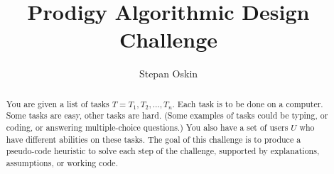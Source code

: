 \documentclass[11pt]{report}
\begin{document}
    \title{Prodigy Algorithmic Design Challenge}

    \author{Stepan Oskin}

    \maketitle

    \begin{abstract}

        You are given a list of tasks $T = T_1, T_2, \dots, T_n$.
        Each task is to be done on a computer.
        Some tasks are easy, other tasks are hard.
        (Some examples of tasks could be typing, or coding, or answering multiple-choice questions.)
        You also have a set of users $U$ who have different abilities on these tasks.
        The goal of this challenge is to produce a pseudo-code heuristic to solve each step of the challenge, supported by explanations, assumptions, or working code.

    \end{abstract}

    
    
    
    

    \medskip
    
    
\end{document}
